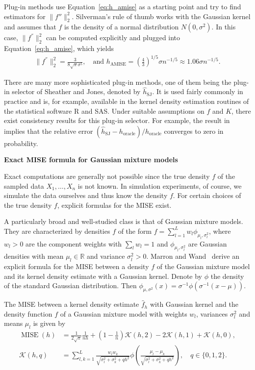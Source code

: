 Plug-in methods use Equation~\eqref{eq:h_amise} as a starting point and try to find estimators for $\|f''\|_2^2$. Silverman's rule of thumb works with the Gaussian kernel and assumes that $f$ is the density of a normal distribution $N(0,\sigma^2)$. In this case, $\|f^{''}\|_2^2$ can be computed explicitly and plugged into Equation~\eqref{eq:h_amise}, which yields
\begin{align*}
    \|f^{''}\|_2^2=\frac{3}{8\sqrt{\pi}\sigma^{5}},\quad\text{and } h_{\operatorname{AMISE}}=\left(\frac{4}{3}\right)^{1/5}\sigma n^{-1/5}\approx1.06\sigma n^{-1/5}.
\end{align*}

There are many more sophisticated plug-in methods, one of them being the plug-in selector of Sheather and Jones, denoted by $\hat{h}_{\text{SJ}}$. It is used fairly commonly in practice and is, for example, available in the kernel density estimation routines of the statistical software R and SAS. Under suitable assumptions on $f$ and $K$, there exist consistency results for this plug-in selector. For example, the result in~\cite[Equation~(10)]{sheather_reliable_1991} implies that the relative error $(\hat{h}_{\text{SJ}}-h_{\text{oracle}})/h_{\text{oracle}}$ converges to zero in probability.

\textbf{Exact MISE formula for Gaussian mixture models}

Exact computations are generally not possible since the true density $f$ of the sampled data $X_1,\dots,X_n$ is not known. In simulation experiments, of course, we simulate the data ourselves and thus know the density $f$. For certain choices of the true density $f$, explicit formulas for the MISE exist.

A particularly broad and well-studied class is that of Gaussian mixture models. They are characterized by densities $f$ of the form $f=\sum_{l=1}^{L}w_l\phi_{\mu_l,\sigma_l^2}$, where $w_l>0$ are the component weights with $\sum_lw_l=1$ and $\phi_{\mu_l,\sigma_l^2}$ are Gaussian densities with mean $\mu_l\in\mathbb{R}$ and variance $\sigma_l^2>0$. Marron and Wand~\cite{10.1214/aos/1176348653} derive an explicit formula for the MISE between a density $f$ of the Gaussian mixture model and its kernel density estimate with a Gaussian kernel. Denote by $\phi$ the density of the standard Gaussian distribution. Then $\phi_{\mu,\sigma^2}(x)=\sigma^{-1}\phi(\sigma^{-1}(x-\mu))$.

\begin{Prop}
    The MISE between a kernel density estimate $\hat{f}_h$ with Gaussian kernel and the density function $f$ of a Gaussian mixture model with weights $w_l$, variances $\sigma_l^2$ and means $\mu_l$ is given by
    \begin{align}
        \operatorname{MISE}(h)&=\frac{1}{2\sqrt{\pi}}\frac{1}{nh}+\left(1-\frac{1}{n}\right)\mathcal{K}(h,2)-2\mathcal{K}(h,1)+\mathcal{K}(h,0),\\
        \mathcal{K}(h,q)&=\sum_{l,k=1}^{L}\frac{w_lw_k}{\sqrt{\sigma_l^2+\sigma_k^2+qh^2}}\phi\left(\frac{\mu_l-\mu_k}{\sqrt{\sigma_l^2+\sigma_k^2+qh^2}}\right),\quad q\in\{0,1,2\}.
    \end{align}
\end{Prop}

